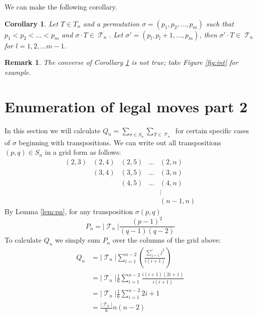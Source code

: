 \documentclass[10pt]{amsart} %
\newtheorem{remk}{Remark}
\newtheorem{corol}{Corollary}
\theoremstyle{definition}
\DeclareMathOperator{\T}{\mathcal{T}}
\begin{document}
 We can make the following corollary.  


\begin{corol}\label{cor:subsig}
 Let $T \in T_n$ and a permutation $ \sigma  = (p_1,p_2,\dots,p_m)$ such that $p_1 < p_2 < \dots <  p_m$ and $\sigma \cdot T \in \T_n$.  Let $\sigma' = (p_l,p_l+1,\dots,p_m)$, then $\sigma' \cdot T \in \T_n$ for $l = 1,2,\dots m-1$.
\end{corol}

\begin{remk}
 The converse of Corollary \ref{cor:subsig} is not true; take Figure \ref{fig:int} for example.
\end{remk}

 \section{Enumeration of legal moves part 2}
In this section we will calculate $Q_n = \sum_{\sigma \in S_n}\sum_{T \in \T_n}$ for certain specific cases of $\sigma$ beginning with transpositions.  We can write out all transpositions $(p,q) \in S_n$ in a grid form as follows:
 \[ \begin{array}{c|c|c|c|c}
     (2,3)  & (2,4)  & (2,5) & \dots & (2,n) \\
       & (3,4)  & (3,5) & \dots &(3,n) \\
       &        &  (4,5) & \dots & (4,n) \\
       &&&& \vdots \\
       &&&&(n-1,n)
    \end{array} 
\]
By Lemma \ref{lem:pn}, for any transposition $\sigma(p,q)$ 
\[P_n = \lvert \T_n\rvert\frac{(p-1)^{2}}{(q-1)(q-2)}\]
To calculate $Q_n$ we simply sum $P_n$ over the columns of the grid above:  
\begin{align*}
 Q_{n} &= \lvert \T_n\rvert\sum_{i=1}^{n-2} \left( \frac{ \sum_{j=1}^{i} j^2}{i(i+1)} \right) \\
 &= \lvert \T_n\rvert\frac{1}{6} \sum_{i=1}^{n-2} \frac{i(i+1)(2i +1)}{i(i+1)}\\
 &= \lvert \T_n\rvert\frac{1}{6} \sum_{i=1}^{n-2} 2i +1 \\
 & = \frac{\lvert \T_n\rvert}{6} n(n-2) 
\end{align*}
\end{document}
